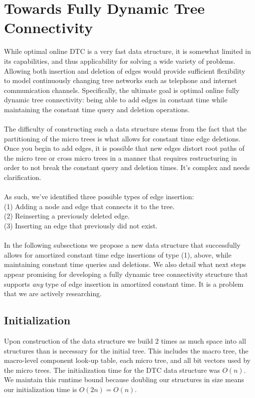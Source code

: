 \documentclass{article}
\begin{document}
\section{Towards Fully Dynamic Tree Connectivity}
While optimal online DTC is a very fast data structure, it is somewhat limited in its capabilities, and thus applicability for solving a wide variety of problems. Allowing both insertion and deletion of edges would provide sufficient flexibility to model continuously changing tree networks such as telephone and internet communication channels. Specifically, the ultimate goal is optimal online fully dynamic tree connectivity: being able to add edges in constant time while maintaining the constant time query and deletion operations. \\ \\
The difficulty of constructing such a data structure stems from the fact that the partitioning of the micro trees is what allows for constant time edge deletions. Once you begin to add edges, it is possible that new edges distort root paths of the micro tree or cross micro trees in a manner that requires restructuring in order to not break the constant query and deletion times. It's complex and needs clarification. \\ \\
As such, we've identified three possible types of edge insertion: \\
(1) Adding a node and edge that connects it to the tree. \\
(2) Reinserting a previously deleted edge. \\
(3) Inserting an edge that previously did not exist. \\ \\
In the following subsections we propose a new data structure that successfully allows for amortized constant time edge insertions of type (1), above, while maintaining constant time queries and deletions. We also detail what next steps appear promising for developing a fully dynamic tree connectivity structure that supports \textit{any} type of edge insertion in amortized constant time. It is a problem that we are actively researching.

\subsection{Initialization}
Upon construction of the data structure we build $2$ times as much space into all structures than is necessary for the initial tree. This includes the macro tree, the macro-level component look-up table, each micro tree, and all bit vectors used by the micro trees. The initialization time for the DTC data structure was $O(n)$. We maintain this runtime bound because doubling our structures in size means our initialization time is $O(2n) = O(n)$.
\end{document}
